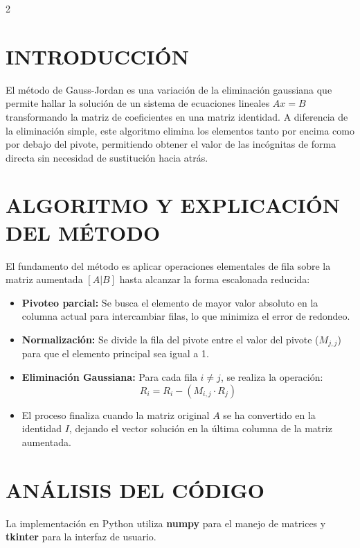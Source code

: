 \documentclass{rmf-d}
\begin{document}
\begin{multicols}{2}

\section{INTRODUCCIÓN}
\label{sec:1}
El método de Gauss-Jordan es una variación de la eliminación gaussiana que permite hallar la solución de un sistema de ecuaciones lineales $Ax = B$ transformando la matriz de coeficientes en una matriz identidad. A diferencia de la eliminación simple, este algoritmo elimina los elementos tanto por encima como por debajo del pivote, permitiendo obtener el valor de las incógnitas de forma directa sin necesidad de sustitución hacia atrás.

\section{ALGORITMO Y EXPLICACIÓN DEL MÉTODO}
\label{sec:2}
El fundamento del método es aplicar operaciones elementales de fila sobre la matriz aumentada $[A|B]$ hasta alcanzar la forma escalonada reducida:
\begin{itemize}
    \item \textbf{Pivoteo parcial:} Se busca el elemento de mayor valor absoluto en la columna actual para intercambiar filas, lo que minimiza el error de redondeo.
    \item \textbf{Normalización:} Se divide la fila del pivote entre el valor del pivote ($M_{j,j}$) para que el elemento principal sea igual a 1.
    \item \textbf{Eliminación Gaussiana:} Para cada fila $i \neq j$, se realiza la operación:
    \begin{equation}
        R_i = R_i - (M_{i,j} \cdot R_j)
    \end{equation}
    \item El proceso finaliza cuando la matriz original $A$ se ha convertido en la identidad $I$, dejando el vector solución en la última columna de la matriz aumentada.
\end{itemize}

\section{ANÁLISIS DEL CÓDIGO}
\label{sec:3}
La implementación en Python utiliza \textbf{numpy} para el manejo de matrices y \textbf{tkinter} para la interfaz de usuario.


\end{multicols}
\end{document}
